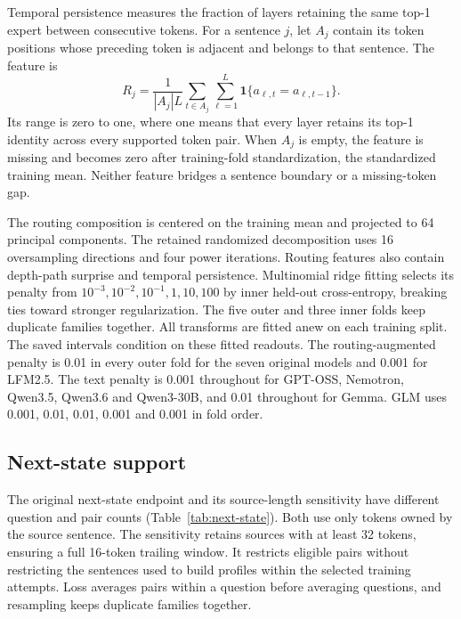 Temporal persistence measures the fraction of layers retaining the same top-1 expert between consecutive tokens.
%
For a sentence $j$, let $A_j$ contain its token positions whose preceding token is adjacent and belongs to that sentence.
%
The feature is
\begin{equation}
R_j=\frac{1}{|A_j|L}\sum_{t\in A_j}\sum_{\ell=1}^{L}
\mathbf{1}\{a_{\ell,t}=a_{\ell,t-1}\}.
\end{equation}
Its range is zero to one, where one means that every layer retains its top-1 identity across every supported token pair.
%
When $A_j$ is empty, the feature is missing and becomes zero after training-fold standardization, the standardized training mean.
%
Neither feature bridges a sentence boundary or a missing-token gap.
%

The routing composition is centered on the training mean and projected to 64 principal components.
%
The retained randomized decomposition uses 16 oversampling directions and four power iterations.
%
Routing features also contain depth-path surprise and temporal persistence.
%
Multinomial ridge fitting selects its penalty from $10^{-3},10^{-2},10^{-1},1,10,100$ by inner held-out cross-entropy, breaking ties toward stronger regularization.
%
The five outer and three inner folds keep duplicate families together.
%
All transforms are fitted anew on each training split.
%
The saved intervals condition on these fitted readouts.
%
The routing-augmented penalty is 0.01 in every outer fold for the seven original models and 0.001 for LFM2.5.
%
The text penalty is 0.001 throughout for GPT-OSS, Nemotron, Qwen3.5, Qwen3.6 and Qwen3-30B, and 0.01 throughout for Gemma.
%
GLM uses 0.001, 0.01, 0.01, 0.001 and 0.001 in fold order.
%

\subsection{Next-state support}
\label{app:next-state}
The original next-state endpoint and its source-length sensitivity have different question and pair counts (Table~\ref{tab:next-state}).
%
Both use only tokens owned by the source sentence.
%
The sensitivity retains sources with at least 32 tokens, ensuring a full 16-token trailing window.
%
It restricts eligible pairs without restricting the sentences used to build profiles within the selected training attempts.
%
Loss averages pairs within a question before averaging questions, and resampling keeps duplicate families together.
%



